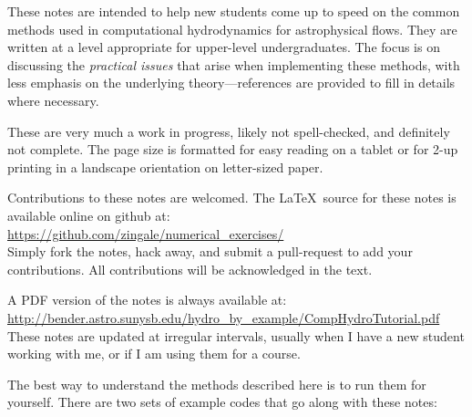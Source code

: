 

These notes are intended to help new students come up to speed on the
common methods used in computational hydrodynamics for astrophysical
flows.  They are written at a level appropriate for upper-level
undergraduates.  The focus is on discussing the {\em practical issues}
that arise when implementing these methods, with less emphasis on the
underlying theory---references are provided to fill in details where
necessary.

These are very much a work in progress, likely not spell-checked, and
definitely not complete.  The page size is formatted for easy reading
on a tablet or for 2-up printing in a landscape orientation on
letter-sized paper.  

Contributions to these notes are welcomed.  The \LaTeX\ source
for these notes is available online on github at: \\[0.25em]
%
\url{https://github.com/zingale/numerical_exercises/} \\[0.25em]
%
Simply fork the notes, hack away, and submit a pull-request to add
your contributions.  All contributions will be acknowledged in the text.


A PDF version of the notes is always available
at: \\[0.25em]
%
\url{http://bender.astro.sunysb.edu/hydro_by_example/CompHydroTutorial.pdf} \\[0.25em]
%
These notes are updated at irregular intervals, usually when I have a
new student working with me, or if I am using them for a course.

The best way to understand the methods described here is to run
them for yourself.  There are two sets of example codes that
go along with these notes:

